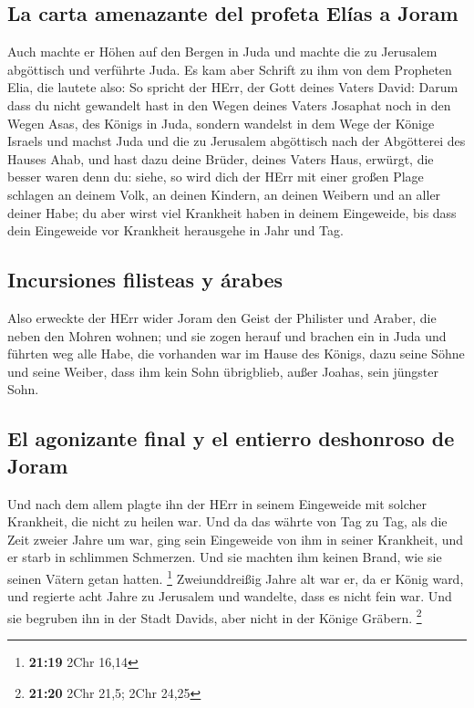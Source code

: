 \hypertarget{la-carta-amenazante-del-profeta-eluxedas-a-joram}{%
\subsection{La carta amenazante del profeta Elías a
Joram}\label{la-carta-amenazante-del-profeta-eluxedas-a-joram}}

 Auch machte er Höhen auf den Bergen in Juda und machte
die zu Jerusalem abgöttisch und verführte Juda.  Es kam
aber Schrift zu ihm von dem Propheten Elia, die lautete also: So spricht
der HErr, der Gott deines Vaters David: Darum dass du nicht gewandelt
hast in den Wegen deines Vaters Josaphat noch in den Wegen Asas, des
Königs in Juda,  sondern wandelst in dem Wege der Könige
Israels und machst Juda und die zu Jerusalem abgöttisch nach der
Abgötterei des Hauses Ahab, und hast dazu deine Brüder, deines Vaters
Haus, erwürgt, die besser waren denn du:  siehe, so wird
dich der HErr mit einer großen Plage schlagen an deinem Volk, an deinen
Kindern, an deinen Weibern und an aller deiner Habe;  du
aber wirst viel Krankheit haben in deinem Eingeweide, bis dass dein
Eingeweide vor Krankheit herausgehe in Jahr und Tag.

\hypertarget{incursiones-filisteas-y-uxe1rabes}{%
\subsection{Incursiones filisteas y
árabes}\label{incursiones-filisteas-y-uxe1rabes}}

 Also erweckte der HErr wider Joram den Geist der
Philister und Araber, die neben den Mohren wohnen;  und
sie zogen herauf und brachen ein in Juda und führten weg alle Habe, die
vorhanden war im Hause des Königs, dazu seine Söhne und seine Weiber,
dass ihm kein Sohn übrigblieb, außer Joahas, sein jüngster Sohn.

\hypertarget{el-agonizante-final-y-el-entierro-deshonroso-de-joram}{%
\subsection{El agonizante final y el entierro deshonroso de
Joram}\label{el-agonizante-final-y-el-entierro-deshonroso-de-joram}}

 Und nach dem allem plagte ihn der HErr in seinem
Eingeweide mit solcher Krankheit, die nicht zu heilen war.
 Und da das währte von Tag zu Tag, als die Zeit zweier
Jahre um war, ging sein Eingeweide von ihm in seiner Krankheit, und er
starb in schlimmen Schmerzen. Und sie machten ihm keinen Brand, wie sie
seinen Vätern getan hatten. \footnote{\textbf{21:19} 2Chr 16,14}
 Zweiunddreißig Jahre alt war er, da er König ward, und
regierte acht Jahre zu Jerusalem und wandelte, dass es nicht fein war.
Und sie begruben ihn in der Stadt Davids, aber nicht in der Könige
Gräbern. \footnote{\textbf{21:20} 2Chr 21,5; 2Chr 24,25}

